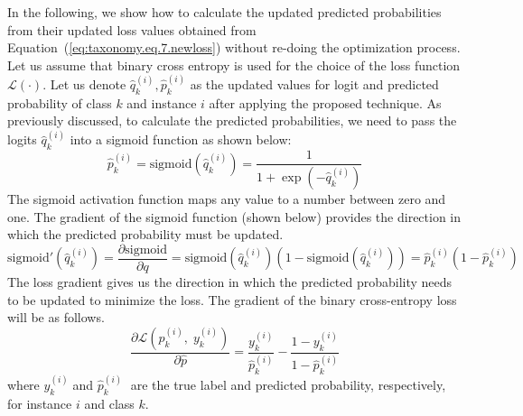 In the following, we show how to calculate the updated predicted probabilities from their updated loss values obtained from Equation~(\ref{eq:taxonomy.eq.7.newloss}) without re-doing the optimization process. Let us assume that binary cross entropy is used for the choice of the loss function $\mathcal{L}(\cdot) $. Let us denote $\widehat{q}_k^{(i)} , \widehat{p}_k^{(i)} $ as the updated values for logit and predicted probability of class $k $ and instance $i $ after applying the proposed technique. As previously discussed, to calculate the predicted probabilities, we need to pass the logits ${\widehat q}_k^{(i)} $ into a sigmoid function as shown below:
\begin{equation}
    \label{eq:taxonomy.eq.9.sigmoid}
    \widehat{p}_k^{(i)}=\text{sigmoid}\left(\widehat{q}_k^{(i)}\right)=\frac1{1+\exp\left(-\widehat{q}_k^{(i)}\right)}
\end{equation}
The sigmoid activation function maps any value to a number between zero and one. The gradient of the sigmoid function (shown below) provides the direction in which the predicted probability must be updated.
\begin{equation}
    \label{eq:taxonomy.eq.10.sigmoidprime}
    \text{sigmoid}'\left(\widehat{q}_k^{(i)}\right)=\frac{\partial{\text{sigmoid}}}{\partial{q}}=\text{sigmoid}\left(\widehat{q}_k^{(i)}\right)\left(1-\text{sigmoid}\left(\widehat{q}_k^{(i)}\right)\right)=\widehat{p}_k^{(i)}\left(1-\widehat{p}_k^{(i)}\right)
\end{equation}
The loss gradient gives us the direction in which the predicted probability needs to be updated to minimize the loss. The gradient of the binary cross-entropy loss will be as follows.
\begin{equation}
    \label{eq:taxonomy.eq.11.lossgradient}
    \frac{\partial \mathcal{L} \left( \widehat{p}_k^{(i)},\;y_k^{(i)}\right)}{\partial \widehat{p}}=\frac{y_k^{(i)}}{\widehat{p}_k^{(i)}}-\frac{1-y_k^{(i)}}{1-\widehat{p}_k^{(i)}}
\end{equation}
where $y_k^{(i)}\; $and ${\widehat p}_k^{(i)}\; $ are the true label and predicted probability, respectively, for instance $i $ and class $k $.

